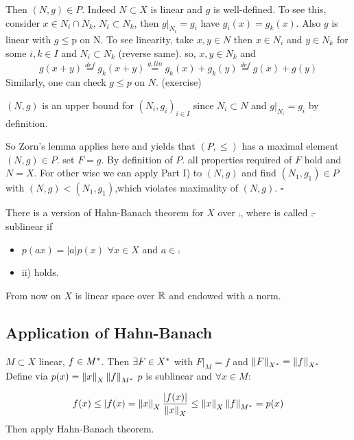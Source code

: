     Then $(N,g)\in P$. Indeed $N\subset X$ is linear and $g$ is well-defined. To see this, consider $x\in N_i\cap N_k$, $N_i\subset N_k$, then  $g|_{N_i}=g_i$ have $g_i(x)=g_k(x)$. Also $g$ is linear with $g\leq $p on N. To see linearity, take $x,y\in N$ then $x\in N_i$ and $y \in N_k$ for some $i,k\in I$ and $N_i\subset N_k$ (reverse same). so, $x,y\in N_k$ and 
    $$
g(x+y)\stackrel{def}{=}g_k(x+y)\stackrel{g,lin}{=}g_k(x)+g_k(y)\stackrel{def}{=}g(x)+g(y)
    $$
    Similarly, one can check $g\leq p$ on $N$. (exercise)

    $(N,g)$ is an upper bound for $(N_i,g_i)_{i\in I}$ since $N_i\subset N$ and $g|_{N_i}=g_i$ by definition.

    So Zorn's lemma applies here and yields that $(P,\leq)$ has a maximal element $(N,g)\in P$. set $F=g$. By definition of $P$. all properties required of $F$ hold and $N=X$. For other wise we can apply Part I) to $(N,g)$ and find $(N_1,g_1)\in P$ with $(N,g)<(N_1,g_1)$,which violates maximality of $(N,g)$. $\square$
    

\begin{remark}
    There is a version of Hahn-Banach theorem for $X$ over $\comp$, where  is called $\comp$-sublinear if \begin{itemize}
        \item $p(ax)=|a|p(x)\,\,\forall x\in X$ and $a\in \comp$
        \item ii) holds.
    \end{itemize}
    \placeholder
\end{remark}

From now on $X$ is linear space over $\mathbb{R}$ and endowed with a norm.

\subsection{Application of Hahn-Banach} 
\begin{corollary}\rm\nextline
    $M\subset X$ linear, $f\in {M}^*$. Then $\exists F\in {X}^*$ with $F|_M=f$ and $\left\|{F}\right\|_{{X}^*}=\left\|{f}\right\|_{{X}^*}$
    \prf\\
    Define  via $p(x)=\left\|{x}\right\|_X\left\|{f}\right\|_{{M}^*}$
    $p$ is sublinear and $\forall x\in M$:

    $$
f(x)\leq|f(x)=\left\|{x}\right\|_X\frac{|f(x)|}{\left\|{x}\right\|_X}\leq\left\|{x}\right\|_X\left\|{f}\right\|_{{M}^*}=p(x)
    $$
    Then apply Hahn-Banach theorem.
\end{corollary}

